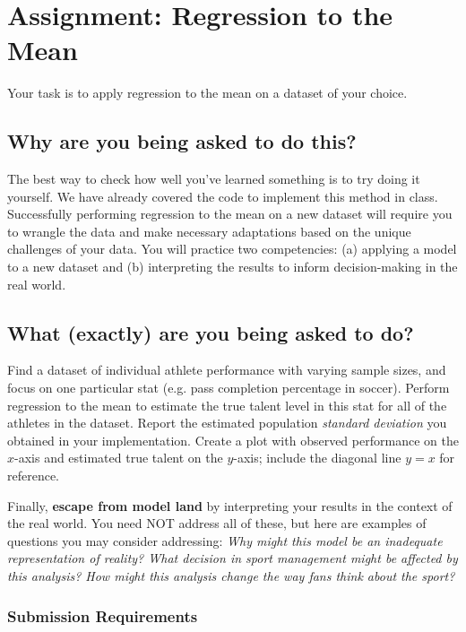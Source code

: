 \documentclass{article}
\begin{document}
  \section*{\sc Assignment: Regression to the Mean}

    Your task is to apply regression to the mean on a dataset of your choice.
  
    \subsection*{\sc Why are you being asked to do this?}

      The best way to check how well you've learned something is to try doing it yourself. We have already covered the code to implement this method in class. Successfully performing regression to the mean on a new dataset will require you to wrangle the data and make necessary adaptations based on the unique challenges of your data. You will practice two competencies: (a) applying a model to a new dataset and (b) interpreting the results to inform decision-making in the real world.
    
    \subsection*{\sc What (exactly) are you being asked to do?}

      Find a dataset of individual athlete performance with varying sample sizes, and focus on one particular stat (e.g. pass completion percentage in soccer). Perform regression to the mean to estimate the true talent level in this stat for all of the athletes in the dataset. Report the estimated population {\it standard deviation} you obtained in your implementation. Create a plot with observed performance on the $x$-axis and estimated true talent on the $y$-axis; include the diagonal line $y = x$ for reference.

      Finally, {\bf escape from model land} by interpreting your results in the context of the real world. You need NOT address all of these, but here are examples of questions you may consider addressing: {\it Why might this model be an inadequate representation of reality? What decision in sport management might be affected by this analysis? How might this analysis change the way fans think about the sport?}

      \subsubsection*{\sc Submission Requirements}
\end{document}
